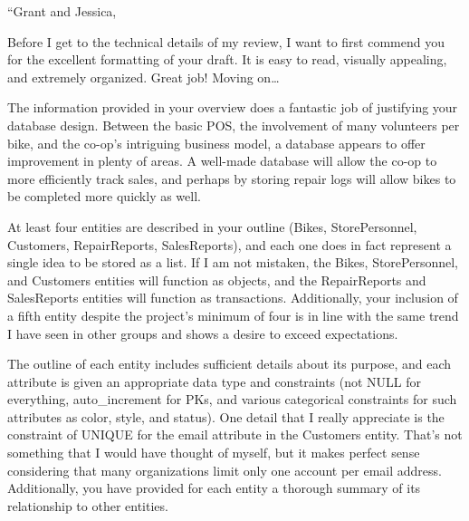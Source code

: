 \documentclass{article}
\begin{document}
\begin{tcolorbox}[colback=secondarycolor, colframe=primarycolor, title=\textbf{Step 1: Peer Review 3 - Drew Schlabach}]
``Grant and Jessica,

\vspace{0.2cm}

Before I get to the technical details of my review, I want to first commend you for the excellent formatting of your draft. It is easy to read, visually appealing, and extremely organized. Great job! Moving on…

\vspace{0.2cm}

The information provided in your overview does a fantastic job of justifying your database design. Between the basic POS, the involvement of many volunteers per bike, and the co-op’s intriguing business model, a database appears to offer improvement in plenty of areas. A well-made database will allow the co-op to more efficiently track sales, and perhaps by storing repair logs will allow bikes to be completed more quickly as well. 

\vspace{0.2cm}

At least four entities are described in your outline (Bikes, StorePersonnel, Customers, RepairReports, SalesReports), and each one does in fact represent a single idea to be stored as a list. If I am not mistaken, the Bikes, StorePersonnel, and Customers entities will function as objects, and the RepairReports and SalesReports entities will function as transactions. Additionally, your inclusion of a fifth entity despite the project’s minimum of four is in line with the same trend I have seen in other groups and shows a desire to exceed expectations.

\vspace{0.2cm}

The outline of each entity includes sufficient details about its purpose, and each attribute is given an appropriate data type and constraints (not NULL for everything, auto\_increment for PKs, and various categorical constraints for such attributes as color, style, and status). One detail that I really appreciate is the constraint of UNIQUE for the email attribute in the Customers entity. That’s not something that I would have thought of myself, but it makes perfect sense considering that many organizations limit only one account per email address. Additionally, you have provided for each entity a thorough summary of its relationship to other entities. 


\end{tcolorbox}
\end{document}

